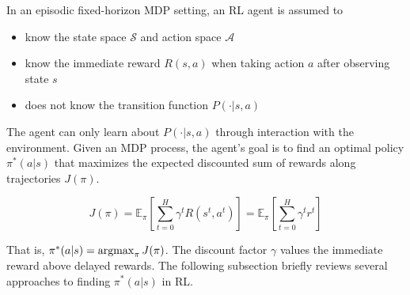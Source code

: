 In an episodic fixed-horizon MDP setting,
an RL agent is assumed to

\begin{itemize}
  \item know the state space $\mathcal{S}$ and action space $\mathcal{A}$
  \item know the immediate reward $R(s,a)$ when taking action $a$ after observing state $s$
  \item does not know the transition function $P(\cdot|s,a)$
\end{itemize}

The agent can only learn about $P(\cdot|s,a)$ through interaction with the environment.
Given an MDP process,
the agent's goal is to find an optimal policy $\pi^*(a|s)$ that maximizes the expected discounted sum of rewards along trajectories $J(\pi)$.

\[
  J(\pi) = \mathbb{E}_\pi [\sum^H_{t=0} \gamma^t R(s^t,a^t)] = \mathbb{E}_\pi [\sum^H_{t=0} \gamma^t r^t]
\]

That is,
$\pi^*(a|s)=\operatorname*{argmax}_\pi J(\pi)$.
The discount factor $\gamma$ values the immediate reward above delayed rewards.
The following subsection briefly reviews several approaches to finding $\pi^*(a|s)$ in RL.
